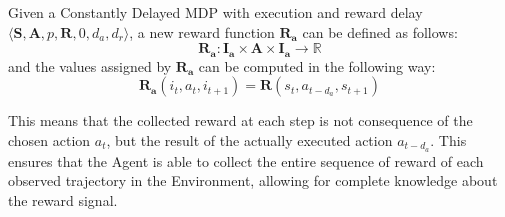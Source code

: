                 \begin{definition}
                    \label{def:execaugmentreward}
                    Given a Constantly Delayed MDP with execution and reward delay $ \langle \mathbf{S}, \mathbf{A}, p, \mathbf{R}, 0, d_a, d_r \rangle$,
                    a new reward function $\mathbf{R_{a}}$ can be defined as follows:
                    \[ \mathbf{R_{a}}: \mathbf{I_{a}} \times \mathbf{A} \times \mathbf{I_{a}} \rightarrow \mathds{R}\]
                    and the values assigned by $\mathbf{R_{a}}$ can be computed in the following way:
                    \[ \mathbf{R_{a}}\left( i_t, a_{t}, i_{t+1} \right) = \mathbf{R} \left( s_t, a_{t-d_{a}}, s_{t+1} \right)\]
                \end{definition}
                
                This means that the collected reward at each step is not consequence of the chosen action $a_t$, but the result of the actually executed action $a_{t-d_{a}}$. This ensures that the Agent is able to collect the entire sequence of reward of each observed trajectory in the Environment, allowing for complete knowledge about the reward signal.
                
